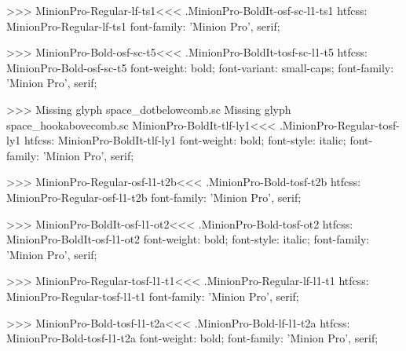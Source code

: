 {>>>
\<MinionPro-Regular-lf-ts1\><<<
.MinionPro-BoldIt-osf-sc-l1-ts1
htfcss:  MinionPro-Regular-lf-ts1  font-family: 'Minion Pro', serif;

>>>
\<MinionPro-Bold-osf-sc-t5\><<<
.MinionPro-BoldIt-tosf-sc-l1-t5
htfcss:  MinionPro-Bold-osf-sc-t5  font-weight: bold; font-variant: small-caps; font-family: 'Minion Pro', serif;

>>>
Missing glyph	space_dotbelowcomb.sc
Missing glyph	space_hookabovecomb.sc
\<MinionPro-BoldIt-tlf-ly1\><<<
.MinionPro-Regular-tosf-ly1
htfcss:  MinionPro-BoldIt-tlf-ly1  font-weight: bold; font-style: italic; font-family: 'Minion Pro', serif;

>>>
\<MinionPro-Regular-osf-l1-t2b\><<<
.MinionPro-Bold-tosf-t2b
htfcss:  MinionPro-Regular-osf-l1-t2b  font-family: 'Minion Pro', serif;

>>>
\<MinionPro-BoldIt-osf-l1-ot2\><<<
.MinionPro-Bold-tosf-ot2
htfcss:  MinionPro-BoldIt-osf-l1-ot2  font-weight: bold; font-style: italic; font-family: 'Minion Pro', serif;

>>>
\<MinionPro-Regular-tosf-l1-t1\><<<
.MinionPro-Regular-lf-l1-t1
htfcss:  MinionPro-Regular-tosf-l1-t1  font-family: 'Minion Pro', serif;

>>>
\<MinionPro-Bold-tosf-l1-t2a\><<<
.MinionPro-Bold-lf-l1-t2a
htfcss:  MinionPro-Bold-tosf-l1-t2a  font-weight: bold; font-family: 'Minion Pro', serif;

}
